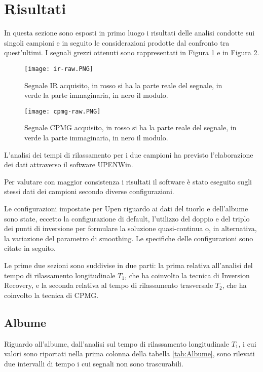 \section*{Risultati}
In questa sezione sono esposti in primo luogo i risultati delle analisi condotte sui singoli campioni e in seguito le considerazioni prodotte dal confronto tra quest'ultimi. I segnali grezzi ottenuti sono rappresentati in Figura \ref{fig:ir-raw} e in Figura \ref{fig:cpmg-raw}.

\begin{figure}
\texttt{[image: ir-raw.PNG]}
\caption{Segnale IR acquisito, in rosso si ha la parte reale del segnale, in verde la parte immaginaria, in nero il modulo.}
\label{fig:ir-raw}
\end{figure}
\begin{figure}
\texttt{[image: cpmg-raw.PNG]}
\caption{Segnale CPMG acquisito, in rosso si ha la parte reale del segnale, in verde la parte immaginaria, in nero il modulo.}
\label{fig:cpmg-raw}
\end{figure} 

L'analisi dei tempi di rilassamento per i due campioni ha previsto l'elaborazione dei dati attraverso il software UPENWin.

Per valutare con maggior consistenza i risultati il software è stato eseguito sugli stessi dati dei campioni secondo diverse configurazioni.

Le configurazioni impostate per Upen riguardo ai dati del tuorlo e dell'albume sono state, eccetto la configurazione di default, l'utilizzo del doppio e del triplo dei punti di inversione per formulare la soluzione quasi-continua o, in alternativa, la variazione del parametro di smoothing. 
Le specifiche delle configurazioni sono citate in seguito. 

Le prime due sezioni sono suddivise in due parti: la prima relativa all'analisi del tempo di rilassamento longitudinale $T_1$, che ha coinvolto la tecnica di Inversion Recovery, e la seconda relativa al tempo di rilassamento trasversale $T_2$, che ha coinvolto la tecnica di CPMG. 



\subsection*{Albume} 

Riguardo all'albume, dall'analisi sul tempo di rilassamento longitudinale $T_1$, i cui valori sono riportati nella prima colonna della tabella \ref{tab:Albume}, sono rilevati due intervalli di tempo i cui segnali non sono trascurabili. 

